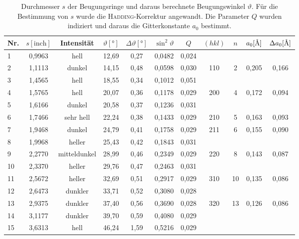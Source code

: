 \documentclass[a4paper,twoside,final]{article}
\begin{document}
\begin{table}[ht]
	\centering
	\caption{Durchmesser $s$ der Beugungsringe und daraus berechnete Beugungswinkel $\vartheta$. Für die Bestimmung von $s$ wurde die \textsc{Hadding}-Korrektur angewandt. Die Parameter $Q$ wurden indiziert und daraus die Gitterkonstante $a_0$ bestimmt.}
	\label{tab:Ergebnisse_ohneFilter}
	\begin{tabular}{l c c c c c | c c c c c }
		\toprule
      Nr. & $s [\text{inch}]$ & Intensität & $\vartheta [\si{\degree}]$ & $\Delta \vartheta [\si{\degree}]$ & $\sin^2 \vartheta $ & $Q$ & $(hkl)$ & $n$ & $a_0 [\si{\textup{\AA}}]$ & $\Delta a_0 [\si{\textup{\AA}}]$\\
    \midrule
    1  & 0,9963 & hell         & 12,69 & 0,27 & 0,0482 & 0,024 &     &    &       &       \\
    2  & 1,1113 & dunkel       & 14,15 & 0,48 & 0,0598 & 0,030 & 110 & 2  & 0,205 & 0,166 \\
    3  & 1,4565 & hell         & 18,55 & 0,34 & 0,1012 & 0,051 &     &    &       &       \\
    4  & 1,5765 & hell         & 20,07 & 0,36 & 0,1178 & 0,029 & 200 & 4  & 0,172 & 0,094 \\
    5  & 1,6166 & dunkel       & 20,58 & 0,37 & 0,1236 & 0,031 &     &    &       &       \\
    6  & 1,7466 & sehr hell    & 22,24 & 0,38 & 0,1433 & 0,029 & 210 & 5  & 0,163 & 0,093 \\
    7  & 1,9468 & dunkel       & 24,79 & 0,41 & 0,1758 & 0,029 & 211 & 6  & 0,155 & 0,090 \\
    8  & 1,9968 & heller       & 25,43 & 0,42 & 0,1843 & 0,031 &     &    &       &       \\
    9  & 2,2770 & mitteldunkel & 28,99 & 0,46 & 0,2349 & 0,029 & 220 & 8  & 0,143 & 0,087 \\
    10 & 2,3370 & heller       & 29,76 & 0,47 & 0,2463 & 0,031 &     &    &       &       \\
    11 & 2,5672 & heller       & 32,69 & 0,51 & 0,2917 & 0,029 & 310 & 10 & 0,135 & 0,086 \\
    12 & 2,6473 & dunkler      & 33,71 & 0,52 & 0,3080 & 0,028 &     &    &       &       \\
    13 & 2,9375 & dunkler      & 37,40 & 0,56 & 0,3690 & 0,028 & 320 & 13 & 0,126 & 0,086 \\
    14 & 3,1177 & dunkler      & 39,70 & 0,59 & 0,4080 & 0,029 &     &    &       &       \\
    15 & 3,6313 & hell         & 46,24 & 1,59 & 0,5216 & 0,029 &     &    &       &       \\

\end{tabular}
\end{table}
\end{document}
